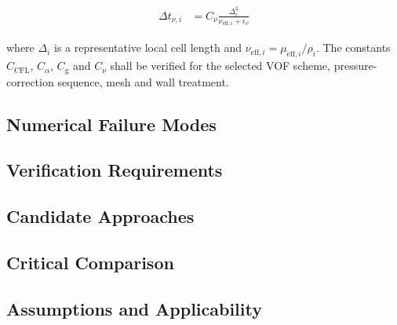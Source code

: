 \begin{align}
  \Delta t_{\nu,i}
  &=
  C_{\nu}
  \frac{
    \Delta_i^2
  }{
    \nu_{\mathrm{eff},i}
    +
    \epsilon_{\nu}
  }
  \label{eq:res-num-tim-local-diffusion-constraint}
\end{align}

where $\Delta_i$ is a representative local cell length and
$\nu_{\mathrm{eff},i}=\mu_{\mathrm{eff},i}/\rho_i$. The constants
$C_{\mathrm{CFL}}$, $C_{\alpha}$, $C_{\mathrm{g}}$ and $C_{\nu}$ shall
be verified for the selected VOF scheme, pressure-correction sequence,
mesh and wall treatment.

\subsection{Numerical Failure Modes}
\label{sec:res-num-tim-numerical-failure-modes}


\subsection{Verification Requirements}
\label{sec:res-num-tim-verification-requirements}


\subsection{Candidate Approaches}
\label{sec:res-num-tim-candidate-approaches}


\subsection{Critical Comparison}
\label{sec:res-num-tim-critical-comparison}


\subsection{Assumptions and Applicability}
\label{sec:res-num-tim-assumptions}


